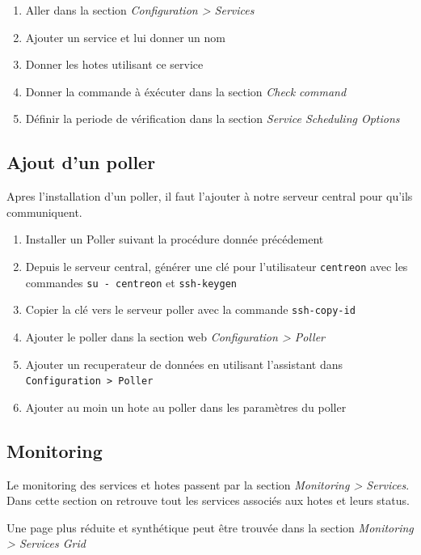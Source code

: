 		\begin{enumerate}
			\item Aller dans la section \emph{Configuration > Services}
			\item Ajouter un service et lui donner un nom
			\item Donner les hotes utilisant ce service
			\item Donner la commande à éxécuter dans la section \emph{Check command}
			\item Définir la periode de vérification dans la section \emph{Service Scheduling Options}
		\end{enumerate}

		\subsection{Ajout d'un poller}

		Apres l'installation d'un poller, il faut l'ajouter à notre serveur central pour qu'ils communiquent.

		\begin{enumerate}
			\item Installer un Poller suivant la procédure donnée précédement
			\item Depuis le serveur central, générer une clé pour l'utilisateur \texttt{centreon} avec les commandes \texttt{su - centreon} et \texttt{ssh-keygen}
			\item Copier la clé vers le serveur poller avec la commande \texttt{ssh-copy-id}
			\item Ajouter le poller dans la section web \emph{Configuration > Poller}
			\item Ajouter un recuperateur de données en utilisant l'assistant dans \texttt{Configuration > Poller}
			\item Ajouter au moin un hote au poller dans les paramètres du poller
		\end{enumerate}


		\subsection{Monitoring}

		Le monitoring des services et hotes passent par la section \emph{Monitoring > Services}.
		Dans cette section on retrouve tout les services associés aux hotes et leurs status.

		Une page plus réduite et synthétique peut être trouvée dans la section \emph{Monitoring > Services Grid}

